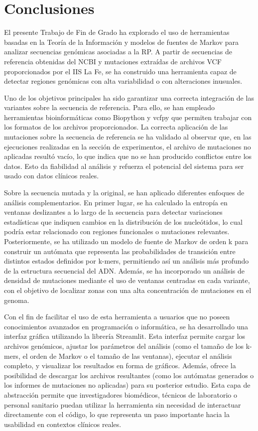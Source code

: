 \documentclass[11pt,spanish,listoffigures,listoftables]{tfgetsinf}
\begin{document}
\chapter{Conclusiones}

El presente Trabajo de Fin de Grado ha explorado el uso de herramientas basadas en la Teoría de la Información y modelos de fuentes de Markov para analizar secuencias genómicas asociadas a la \ac{RP}. A partir de secuencias de referencia obtenidas del \ac{NCBI} y mutaciones extraídas de archivos \ac{VCF} proporcionados por el \ac{IIS} La Fe, se ha construido una herramienta capaz de detectar regiones genómicas con alta variabilidad o con alteraciones inusuales.

Uno de los objetivos principales ha sido garantizar una correcta integración de las variantes sobre la secuencia de referencia. Para ello, se han empleado herramientas bioinformáticas como Biopython y vcfpy que permiten trabajar con los formatos de los archivos proporcionados. La correcta aplicación de las mutaciones sobre la secuencia de referencia se ha validado al observar que, en las ejecuciones realizadas en la sección de experimentos, el archivo de mutaciones no aplicadas resultó vacío, lo que indica que no se han producido conflictos entre los datos. Esto da fiabilidad al análisis y refuerza el potencial del sistema para ser usado con datos clínicos reales.

Sobre la secuencia mutada y la original, se han aplicado diferentes enfoques de análisis complementarios. En primer lugar, se ha calculado la entropía en ventanas deslizantes a lo largo de la secuencia para detectar variaciones estadísticas que indiquen cambios en la distribución de los nucleótidos, lo cual podría estar relacionado con regiones funcionales o mutaciones relevantes. Posteriormente, se ha utilizado un modelo de fuente de Markov de orden k para construir un autómata que representa las probabilidades de transición entre distintos estados definidos por k-mers, permitiendo así un análisis más profundo de la estructura secuencial del \ac{ADN}. Además, se ha incorporado un análisis de densidad de mutaciones mediante el uso de ventanas centradas en cada variante, con el objetivo de localizar zonas con una alta concentración de mutaciones en el genoma.

Con el fin de facilitar el uso de esta herramienta a usuarios que no poseen conocimientos avanzados en programación o informática, se ha desarrollado una interfaz gráfica utilizando la librería Streamlit. Esta interfaz permite cargar los archivos genómicos, ajustar los parámetros del análisis (como el tamaño de los k-mers, el orden de Markov o el tamaño de las ventanas), ejecutar el análisis completo, y visualizar los resultados en forma de gráficos. Además, ofrece la posibilidad de descargar los archivos resultantes (como los autómatas generados o los informes de mutaciones no aplicadas) para su posterior estudio. Esta capa de abstracción permite que investigadores biomédicos, técnicos de laboratorio o personal sanitario puedan utilizar la herramienta sin necesidad de interactuar directamente con el código, lo que representa un paso importante hacia la usabilidad en contextos clínicos reales.
\end{document}
